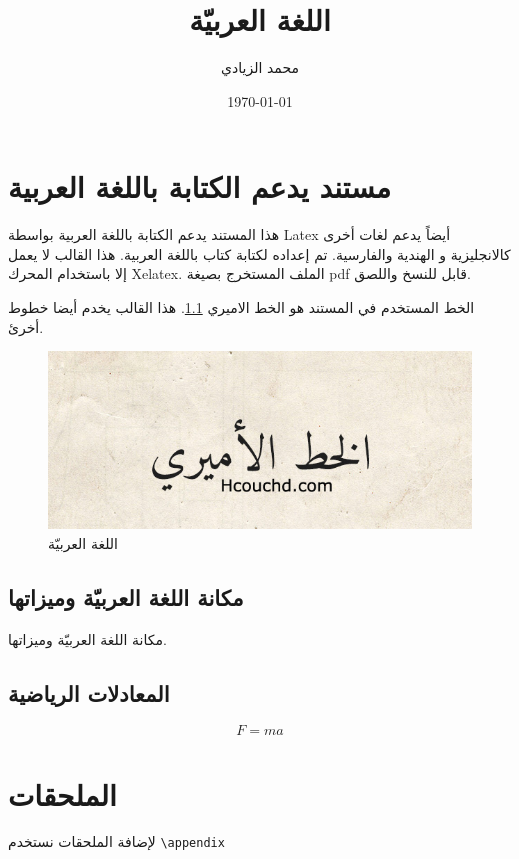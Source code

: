 \documentclass[10pt,oneside]{arabic-book}
\title{اللغة العربيّة}
\author{ محمد الزيادي}
\date{\today}
\begin{document}
 
\chapter{مستند يدعم الكتابة باللغة العربية}
هذا المستند يدعم الكتابة باللغة العربية بواسطة Latex أيضاً يدعم لغات أخرى كالانجليزية و الهندية والفارسية. تم إعداده لكتابة كتاب باللغة العربية. هذا القالب لا يعمل إلا باستخدام المحرك Xelatex. الملف المستخرج بصيغة pdf قابل للنسخ واللصق. 

الخط المستخدم في المستند هو الخط الاميري \ref{fig:fig1}\cite{1}. هذا القالب يخدم أيضا خطوط أخرئ.
\begin{figure}[H]
	\centering
	\includegraphics[width=0.7\linewidth]{fig1}
	\caption{اللغة العربيّة}
	\label{fig:fig1}
\end{figure}

\section{مكانة اللغة العربيّة وميزاتها}
مكانة اللغة العربيّة وميزاتها.
\section{المعادلات الرياضية }
\begin{equation}
    F = m a
\end{equation}
\chapter{الملحقات}
لإضافة الملحقات نستخدم \verb|\appendix|
{}

\end{document}
